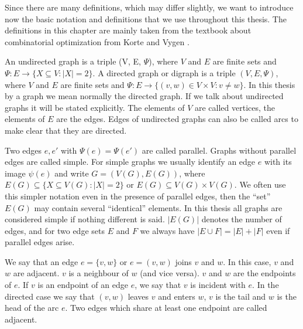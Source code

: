 
Since there are many definitions, which may differ slightly, we want to introduce now the basic notation and 
definitions that we use throughout this thesis. The definitions in this chapter are mainly taken from the textbook 
about combinatorial optimization from Korte and Vygen \cite{KorteVygenCombOpt2007}.

An undirected graph is a triple (V, E, $\Psi$), where $V$ and $E$ are finite sets and
$\Psi: E\to \{X \subseteq V: |X| = 2\}$. 
A directed graph or digraph is a triple $(V, E, \Psi)$,
where $V$ and $E$ are finite sets and $\Psi : E \to \{(v, w) \in V \times V : v \neq w\}$. In this thesis by a
graph we mean normally the directed graph. If we talk about undirected graphs it will be stated 
explicitly. The elements of $V$ are called vertices, the elements of $E$ are the edges. Edges of undirected graphs can 
also be called arcs to make clear that they are directed.

Two edges $e, e'$ with $\Psi(e) = \Psi ( e')$ are called parallel. Graphs without parallel
edges are called simple. For simple graphs we usually identify an edge $e$ with its
image $\psi(e)$ and write $G = (V(G), E(G))$, where $E(G) \subseteq \{X \subseteq V(G) : |X| = 2\}$
or $E(G) \subseteq V(G) \times V(G)$. We often use this simpler notation even in the presence
of parallel edges, then the ``set'' $E (G)$ may contain several ``identical'' elements. In this thesis all graphs 
are considered simple if nothing different is said. %
$|E(G)|$ denotes the number of edges, and for two edge sets $E$ and $F$ we always
have $|E \cup F | = |E | + |F |$ even if parallel edges arise.

We say that an edge $e = \{v, w\}$ or $e = (v, w)$ joins $v$ and $w$. In this case, $v$ and $w$ are adjacent. $v$ is a 
neighbour of $w$ (and vice versa). $v$ and $w$ are the endpoints of $e$. If $v$ is an endpoint of an edge $e$, we say 
that $v$ is incident with $e$. 
In the directed case we say that $( v, w)$ leaves $v$ and enters $w$, $v$ is the tail and $w$ is the head of the arc 
$e$. Two edges which share at least one endpoint are called adjacent.

